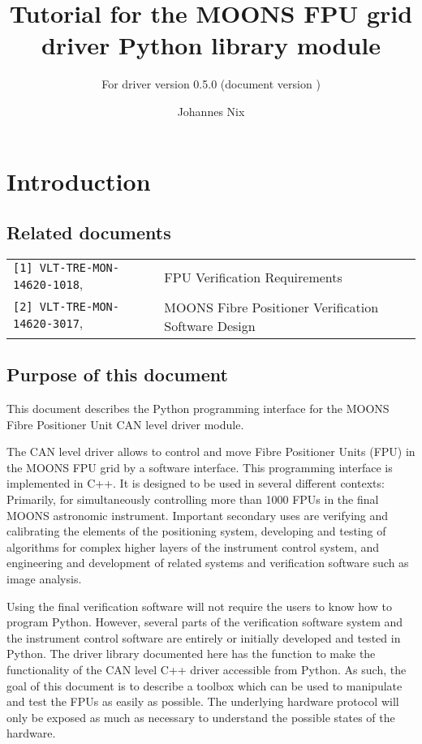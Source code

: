 \documentclass{scrartcl}[12pt,a4paper]
\begin{document}
\title{Tutorial for the MOONS FPU grid driver Python library
  module} \subtitle{For driver version 0.5.0 (document version \texttt{})}

\author{Johannes Nix}

\maketitle

\tableofcontents


\section{Introduction}
\subsection{Related documents}

\begin{tabular}{|ll|}
  \hline
\verb+[1] VLT-TRE-MON-14620-1018+, &  FPU Verification Requirements \\
\verb+[2] VLT-TRE-MON-14620-3017+, & MOONS Fibre Positioner Verification Software Design \\
\hline
\end{tabular}


\subsection{Purpose of this document}
This document describes the Python programming interface for the MOONS
Fibre Positioner Unit CAN level driver module.

The CAN level driver allows to control and move Fibre Positioner Units
(FPU) in the MOONS FPU grid by a software interface. This programming
interface is implemented in C++. It is designed to be used in several
different contexts: Primarily, for simultaneously controlling more
than 1000 FPUs in the final MOONS astronomic instrument. Important
secondary uses are verifying and calibrating the elements of the
positioning system, developing and testing of algorithms for complex
higher layers of the instrument control system, and engineering and
development of related systems and verification software such as image
analysis.

Using the final verification software will not require the users to
know how to program Python.  However, several parts of the
verification software system and the instrument control software are
entirely or initially developed and tested in Python.  The driver
library documented here has the function to make the functionality of
the CAN level C++ driver accessible from Python. As such, the goal of
this document is to describe a toolbox which can be used to manipulate
and test the FPUs as easily as possible. The underlying hardware
protocol will only be exposed as much as necessary to understand the
possible states of the hardware.
\end{document}
